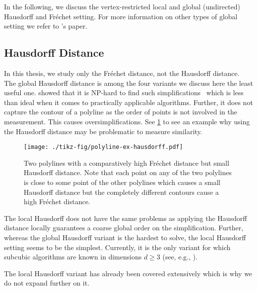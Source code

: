In the following, we discuss the vertex-restricted local and global (undirected) Hausdorff and Fréchet setting. For more information on other types of global setting we refer to \citeauthor{global_curve_simplification}'s paper.

\subsection{Hausdorff Distance}
In this thesis, we study only the Fréchet distance, not the Hausdorff distance. The global Hausdorff distance is among the four variants we discuss here the least useful one. \citeauthor{on_optimal_polyline_simplification_using_the_hausdorff_and_frechet_distance} showed that it is NP-hard to find such simplifications~\cite{on_optimal_polyline_simplification_using_the_hausdorff_and_frechet_distance} which is less than ideal when it comes to practically applicable algorithms. Further, it does not capture the contour of a polyline as the order of points is not involved in the measurement. This causes oversimplifications. See \cref{fig:polyline-ex-hausdorff} to see an example why using the Hausdorff distance may be problematic to measure similarity.

\begin{figure}[b]
  \centering
  \texttt{[image: ./tikz-fig/polyline-ex-hausdorff.pdf]}
  \caption{Two polylines with a comparatively high Fréchet distance but small Hausdorff distance. Note that each point on any of the two polylines is close to some point of the other polylines which causes a small Hausdorff distance but the completely different contours cause a high Fréchet distance.}
  \label{fig:polyline-ex-hausdorff}
\end{figure}

The local Hausdorff does not have the same problems as applying the Hausdorff distance locally guarantees a coarse global order on the simplification. Further, whereas the global Hausdorff variant is the hardest to solve, the local Hausdorff setting seems to be the simplest. Currently, it  is the only variant for which subcubic algorithms are known in dimensions \(d \geq 3\) (see, e.g., \cite{efficiently_approximating_higher_dim}). 

The local Hausdorff variant has already been covered extensively which is why we do not expand further on it. 

